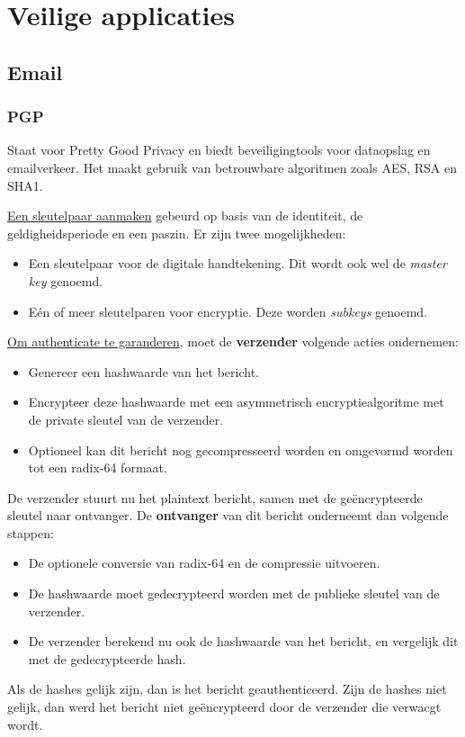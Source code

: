 \documentclass{report}
\begin{document}
	\section{Veilige applicaties}
	\subsection{Email}
	\subsubsection{PGP}
	Staat voor Pretty Good Privacy en biedt beveiligingtools voor dataopslag en emailverkeer. Het maakt gebruik van betrouwbare algoritmen zoals AES, RSA en SHA1.
	
	\underline{Een sleutelpaar aanmaken} gebeurd op basis van de identiteit, de geldigheidsperiode en een paszin. Er zijn twee mogelijkheden:
	\begin{itemize}
		\item[\info] Een sleutelpaar voor de digitale handtekening. Dit wordt ook wel de \emph{master key} genoemd. 
		\item[\info] Eén of meer sleutelparen voor encryptie. Deze worden \emph{subkeys} genoemd. 
	\end{itemize}

	\underline{Om authenticate te garanderen}, moet de \textbf{verzender} volgende acties ondernemen:
	\begin{itemize}
		\item[\info] Genereer een hashwaarde van het bericht.
		\item[\info] Encrypteer deze hashwaarde met een asymmetrisch encryptiealgoritme met de private sleutel van de verzender.
		\item[\info] Optioneel kan dit bericht nog gecompresseerd worden en omgevormd worden tot een radix-64 formaat.
	\end{itemize}
	De verzender stuurt nu het plaintext bericht, samen met de geëncrypteerde sleutel naar ontvanger. De \textbf{ontvanger} van dit bericht onderneemt dan volgende stappen:
	\begin{itemize}
		\item[\info] De optionele conversie van radix-64 en de compressie uitvoeren.
		\item[\info] De hashwaarde moet gedecrypteerd worden met de publieke sleutel van de verzender.
		\item[\info] De verzender berekend nu ook de hashwaarde van het bericht, en vergelijk dit met de gedecrypteerde hash. 
	\end{itemize}
	Als de hashes gelijk zijn, dan is het bericht geauthenticeerd. Zijn de hashes niet gelijk, dan werd het bericht niet geëncrypteerd door de verzender die verwacgt wordt.
\end{document}

